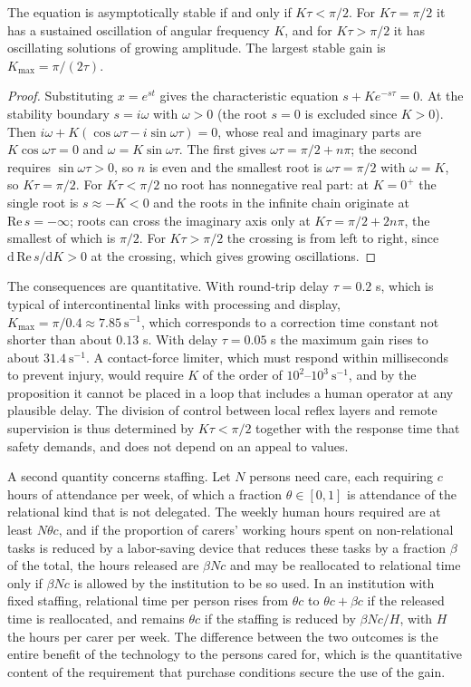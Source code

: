 \begin{proposition}
The equation is asymptotically stable if and only if $K\tau<\pi/2$. For $K\tau=\pi/2$ it has a sustained oscillation of angular frequency $K$, and for $K\tau>\pi/2$ it has oscillating solutions of growing amplitude. The largest stable gain is $K_{\max}=\pi/(2\tau)$.
\end{proposition}

\begin{proof}
Substituting $x=e^{st}$ gives the characteristic equation $s+Ke^{-s\tau}=0$. At the stability boundary $s=i\omega$ with $\omega>0$ (the root $s=0$ is excluded since $K>0$). Then $i\omega+K(\cos\omega\tau-i\sin\omega\tau)=0$, whose real and imaginary parts are $K\cos\omega\tau=0$ and $\omega=K\sin\omega\tau$. The first gives $\omega\tau=\pi/2+n\pi$; the second requires $\sin\omega\tau>0$, so $n$ is even and the smallest root is $\omega\tau=\pi/2$ with $\omega=K$, so $K\tau=\pi/2$. For $K\tau<\pi/2$ no root has nonnegative real part: at $K=0^+$ the single root is $s\approx-K<0$ and the roots in the infinite chain originate at $\mathrm{Re}\,s=-\infty$; roots can cross the imaginary axis only at $K\tau=\pi/2+2n\pi$, the smallest of which is $\pi/2$. For $K\tau>\pi/2$ the crossing is from left to right, since $\mathrm{d}\,\mathrm{Re}\,s/\mathrm{d}K>0$ at the crossing, which gives growing oscillations.
\end{proof}

The consequences are quantitative. With round-trip delay $\tau=0.2$ s, which is typical of intercontinental links with processing and display, $K_{\max}=\pi/0.4\approx7.85\ \mathrm{s^{-1}}$, which corresponds to a correction time constant not shorter than about $0.13$ s. With delay $\tau=0.05$ s the maximum gain rises to about $31.4\ \mathrm{s^{-1}}$. A contact-force limiter, which must respond within milliseconds to prevent injury, would require $K$ of the order of $10^2$--$10^3\ \mathrm{s^{-1}}$, and by the proposition it cannot be placed in a loop that includes a human operator at any plausible delay. The division of control between local reflex layers and remote supervision is thus determined by $K\tau<\pi/2$ together with the response time that safety demands, and does not depend on an appeal to values.

A second quantity concerns staffing. Let $N$ persons need care, each requiring $c$ hours of attendance per week, of which a fraction $\theta\in[0,1]$ is attendance of the relational kind that is not delegated. The weekly human hours required are at least $N\theta c$, and if the proportion of carers' working hours spent on non-relational tasks is reduced by a labor-saving device that reduces these tasks by a fraction $\beta$ of the total, the hours released are $\beta Nc$ and may be reallocated to relational time only if $\beta Nc$ is allowed by the institution to be so used. In an institution with fixed staffing, relational time per person rises from $\theta c$ to $\theta c+\beta c$ if the released time is reallocated, and remains $\theta c$ if the staffing is reduced by $\beta Nc/H$, with $H$ the hours per carer per week. The difference between the two outcomes is the entire benefit of the technology to the persons cared for, which is the quantitative content of the requirement that purchase conditions secure the use of the gain.
